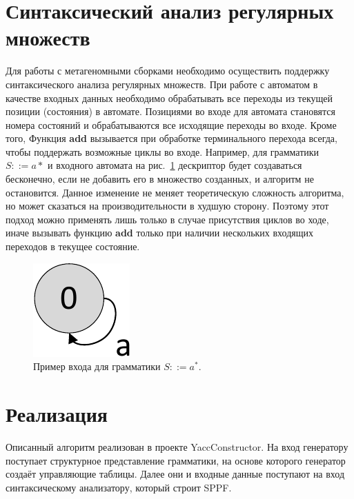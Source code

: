 \documentclass[12pt]{matmex-diploma-custom}
\begin{document}
    \section{Синтаксический анализ регулярных множеств}
    Для работы с метагеномными сборками необходимо осуществить поддержку синтаксического анализа регулярных множеств.
    При работе с автоматом в качестве входных данных необходимо обрабатывать все переходы из текущей позиции (состояния) в автомате.
    Позициями во входе для автомата становятся номера состояний и обрабатываются все исходящие переходы во входе. Кроме того,    
    Функция \textbf{add} вызывается при обработке терминального перехода всегда, чтобы поддержать возможные циклы во входе.
    Например, для грамматики $S ::= a*$ и входного автомата на рис.~\ref{graphEx}
    дескриптор будет создаваться бесконечно, если не добавить его в множество созданных, и алгоритм не остановится.
    Данное изменение не меняет теоретическую сложность алгоритма, но может сказаться на производительности в худшую сторону.
    Поэтому этот подход можно применять лишь только в случае присутствия циклов во ходе, иначе вызывать функцию \textbf{add}
    только при наличии нескольких входящих переходов в текущее состояние.
    
    \begin{figure}[ht]   
        \centering
        \includegraphics[scale=.5]{pictures/graphEx.pdf}
        \caption{Пример входа для грамматики $S ::= a^*$.}
        \label{graphEx}
    \end{figure}

    \section{Реализация}
    
    Описанный алгоритм реализован в проекте YaccConstructor. 
    На вход генератору поступает структурное представление грамматики, на основе которого 
    генератор создаёт управляющие таблицы. Далее они и входные данные поступают на вход
    синтаксическому анализатору, который строит SPPF. 
    
\end{document}
